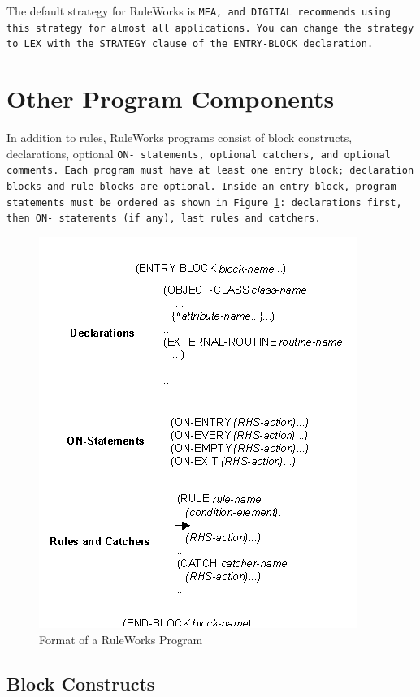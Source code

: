 The default strategy for RuleWorks is \tt{MEA}, and DIGITAL recommends
using this strategy for almost all applications. You can change the
strategy to \tt{LEX} with the \tt{STRATEGY} clause of the
\tt{ENTRY-BLOCK} declaration.

\section{Other Program Components}

In addition to rules, RuleWorks programs consist of block constructs,
declarations, optional \tt{ON-} statements, optional catchers, and
optional comments. Each program must have at least one entry block;
declaration blocks and rule blocks are optional. Inside an entry
block, program statements must be ordered as shown in
Figure~\ref{f:1-4}: declarations first, then \tt{ON-} statements (if
any), last rules and catchers.

\begin{figure}[h]
  \centering
  \includegraphics[scale=0.7]{f1-4}
  \caption{Format of a RuleWorks Program}
  \label{f:1-4}
\end{figure}

\subsection{Block Constructs}

